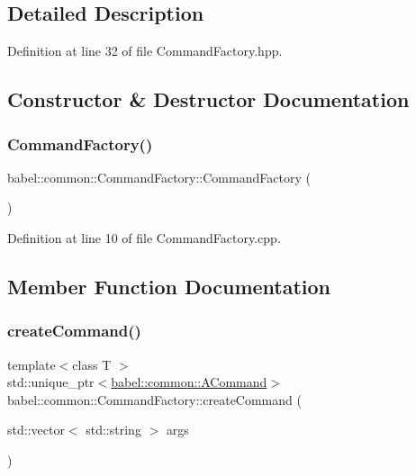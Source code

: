 \subsection{Detailed Description}


Definition at line 32 of file Command\+Factory.\+hpp.



\subsection{Constructor \& Destructor Documentation}
\mbox{\label{classbabel_1_1common_1_1_command_factory_afe9c853c6e8baf55e4629895bd5fa4bd}} 
\subsubsection{\texorpdfstring{Command\+Factory()}{CommandFactory()}}
{\footnotesize\ttfamily babel\+::common\+::\+Command\+Factory\+::\+Command\+Factory (\begin{DoxyParamCaption}{ }\end{DoxyParamCaption})}



Definition at line 10 of file Command\+Factory.\+cpp.



\subsection{Member Function Documentation}
\mbox{\label{classbabel_1_1common_1_1_command_factory_a8917abd2fa6e9e262fd0c5c804b009e6}} 
\subsubsection{\texorpdfstring{create\+Command()}{createCommand()}}
{\footnotesize\ttfamily template$<$class T $>$ \\
std\+::unique\+\_\+ptr$<$\mbox{\hyperlink{classbabel_1_1common_1_1_a_command}{babel\+::common\+::\+A\+Command}}$>$ babel\+::common\+::\+Command\+Factory\+::create\+Command (\begin{DoxyParamCaption}\item[{std\+::vector$<$ std\+::string $>$}]{args }\end{DoxyParamCaption})}



